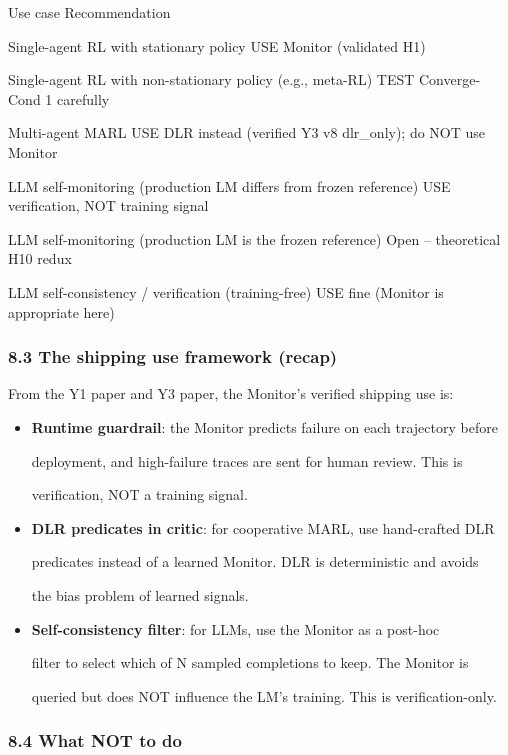 \documentclass[
]{article}
\begin{document}
Use case \textbar{} Recommendation \textbar{}

Single-agent RL with stationary policy \textbar{} USE Monitor (validated
H1) \textbar{}

Single-agent RL with non-stationary policy (e.g., meta-RL) \textbar{}
TEST Converge-Cond 1 carefully \textbar{}

Multi-agent MARL \textbar{} USE DLR instead (verified Y3 v8 dlr\_only);
do NOT use Monitor \textbar{}

LLM self-monitoring (production LM differs from frozen reference)
\textbar{} USE verification, NOT training signal \textbar{}

LLM self-monitoring (production LM is the frozen reference) \textbar{}
Open -- theoretical H10 redux \textbar{}

LLM self-consistency / verification (training-free) \textbar{} USE fine
(Monitor is appropriate here) \textbar{}

\subsubsection{8.3 The shipping use framework
(recap)}\label{the-shipping-use-framework-recap}

From the Y1 paper and Y3 paper, the Monitor's verified shipping use is:

\begin{itemize}
\item
  \textbf{Runtime guardrail}: the Monitor predicts failure on each
  trajectory before

  deployment, and high-failure traces are sent for human review. This is

  verification, NOT a training signal.
\item
  \textbf{DLR predicates in critic}: for cooperative MARL, use
  hand-crafted DLR

  predicates instead of a learned Monitor. DLR is deterministic and
  avoids

  the bias problem of learned signals.
\item
  \textbf{Self-consistency filter}: for LLMs, use the Monitor as a
  post-hoc

  filter to select which of N sampled completions to keep. The Monitor
  is

  queried but does NOT influence the LM's training. This is
  verification-only.
\end{itemize}

\subsubsection{8.4 What NOT to do}\label{what-not-to-do}
\end{document}
